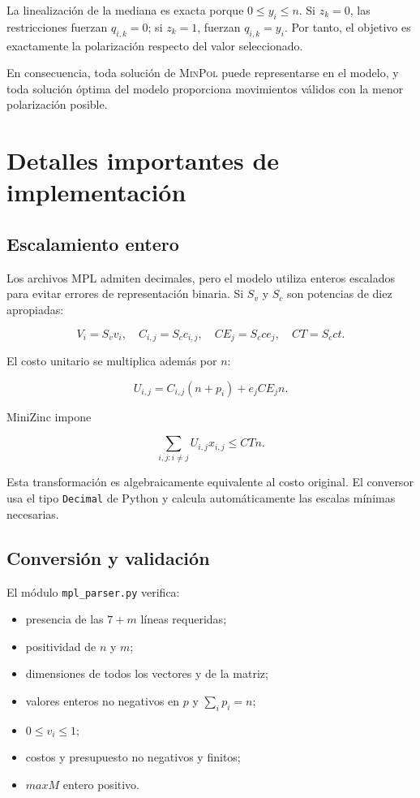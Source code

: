 \documentclass[11pt,letterpaper]{article}
\newcommand{\MinPol}{{\normalfont\scshape MinPol}}
\begin{document}
La linealización de la mediana es exacta porque \(0\le y_i\le n\). Si
\(z_k=0\), las restricciones fuerzan \(q_{i,k}=0\); si \(z_k=1\), fuerzan
\(q_{i,k}=y_i\). Por tanto, el objetivo es exactamente la polarización
respecto del valor seleccionado.

En consecuencia, toda solución de \MinPol{} puede representarse en el modelo,
y toda solución óptima del modelo proporciona movimientos válidos con la
menor polarización posible.

\section{Detalles importantes de implementación}

\subsection{Escalamiento entero}

Los archivos MPL admiten decimales, pero el modelo utiliza enteros escalados
para evitar errores de representación binaria. Si \(S_v\) y \(S_c\) son
potencias de diez apropiadas:

\[
V_i=S_vv_i,\quad C_{i,j}=S_cc_{i,j},\quad
CE_j=S_cce_j,\quad CT=S_cct.
\]

El costo unitario se multiplica además por \(n\):

\[
U_{i,j}=C_{i,j}(n+p_i)+e_jCE_jn.
\]

MiniZinc impone

\[
\sum_{i,j:i\ne j}U_{i,j}x_{i,j}\le CTn.
\]

Esta transformación es algebraicamente equivalente al costo original. El
conversor usa el tipo \texttt{Decimal} de Python y calcula automáticamente
las escalas mínimas necesarias.

\subsection{Conversión y validación}

El módulo \texttt{mpl\_parser.py} verifica:

\begin{itemize}[nosep]
    \item presencia de las \(7+m\) líneas requeridas;
    \item positividad de \(n\) y \(m\);
    \item dimensiones de todos los vectores y de la matriz;
    \item valores enteros no negativos en \(p\) y \(\sum_i p_i=n\);
    \item \(0\le v_i\le1\);
    \item costos y presupuesto no negativos y finitos;
    \item \(maxM\) entero positivo.
\end{itemize}
\end{document}
